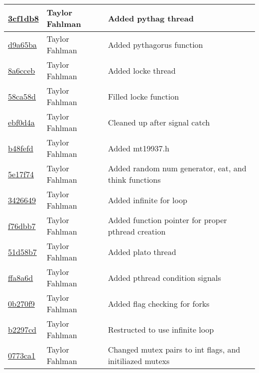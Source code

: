 \begin{tabular}{l l l}
\href{git@github.com:fahlmant/cs444/commit/3cf1db8bc4cada1b6be913bc35423bd7d5f15855}{3cf1db8} & Taylor Fahlman & Added pythag thread\\\hline
\href{git@github.com:fahlmant/cs444/commit/d9a65baf438b66b6e0a9fd4cbfdf14bbb4244d5c}{d9a65ba} & Taylor Fahlman & Added pythagorus function\\\hline
\href{git@github.com:fahlmant/cs444/commit/8a6cceb7c92a712f5428de6f30d8c77f80e8dc16}{8a6cceb} & Taylor Fahlman & Added locke thread\\\hline
\href{git@github.com:fahlmant/cs444/commit/58ca58d458e413a75a8c02487bb65cf6acef3d59}{58ca58d} & Taylor Fahlman & Filled locke function\\\hline
\href{git@github.com:fahlmant/cs444/commit/ebf0d4a0840a6a6bb8b17916dc160c469197593d}{ebf0d4a} & Taylor Fahlman & Cleaned up after signal catch\\\hline
\href{git@github.com:fahlmant/cs444/commit/b48fefd146280d909c6cf2155b3fe1fdec0a3974}{b48fefd} & Taylor Fahlman & Added mt19937.h\\\hline
\href{git@github.com:fahlmant/cs444/commit/5e17f747c9f116ab75a330d8ce0bfdb3f3ec35ab}{5e17f74} & Taylor Fahlman & Added random num generator, eat, and think functions\\\hline
\href{git@github.com:fahlmant/cs444/commit/3426649ae1918162e2ffc19e8b76ffebcbfeafb6}{3426649} & Taylor Fahlman & Added infinite for loop\\\hline
\href{git@github.com:fahlmant/cs444/commit/f76dbb79c66c9c07cf4077e12042e9a2e0fd820f}{f76dbb7} & Taylor Fahlman & Added function pointer for proper pthread creation\\\hline
\href{git@github.com:fahlmant/cs444/commit/51d58b7179ad83063834c6bf5eac684dbe2dcea1}{51d58b7} & Taylor Fahlman & Added plato thread\\\hline
\href{git@github.com:fahlmant/cs444/commit/ffa8a6dcce81ffcaa6b0953ac7e66c13a5eebf23}{ffa8a6d} & Taylor Fahlman & Added pthread condition signals\\\hline
\href{git@github.com:fahlmant/cs444/commit/0b270f9d732ab6a652aaba7f6947f13c0e9cdc46}{0b270f9} & Taylor Fahlman & Added flag checking for forks\\\hline
\href{git@github.com:fahlmant/cs444/commit/b2297cd2ec70c735e39a1cc26d5ff39478f011bf}{b2297cd} & Taylor Fahlman & Restructed to use infinite loop\\\hline
\href{git@github.com:fahlmant/cs444/commit/0773ca18437eb1aff2874e73ff18fe67681602dc}{0773ca1} & Taylor Fahlman & Changed mutex pairs to int flags, and initiliazed mutexs\\\hline

\end{tabular}
